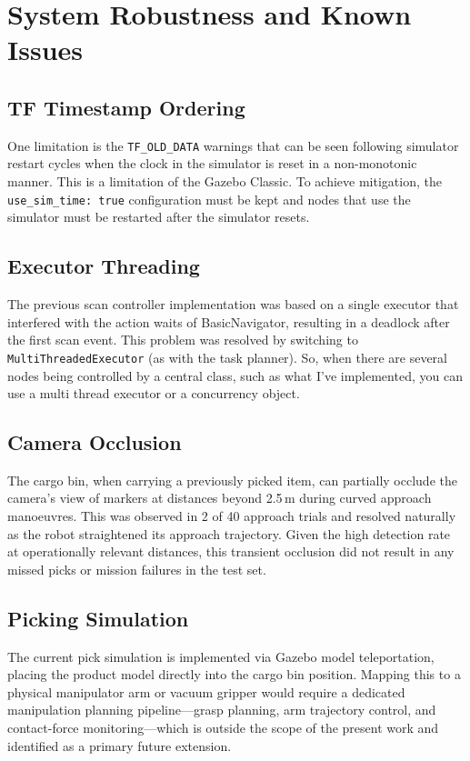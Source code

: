 \documentclass[12pt,a4paper]{report}
\begin{document}
\section{System Robustness and Known Issues}

\subsection{TF Timestamp Ordering}

One limitation is the \texttt{TF\_OLD\_DATA} warnings that can be seen following simulator restart cycles when the clock in the simulator is reset in a non-monotonic manner. This is a limitation of the Gazebo Classic. To achieve mitigation, the \texttt{use\_sim\_time: true} configuration must be kept and nodes that use the simulator must be restarted after the simulator resets.

\subsection{Executor Threading}

The previous scan controller implementation was based on a single executor that interfered with the action waits of BasicNavigator, resulting in a deadlock after the first scan event. This problem was resolved by switching to \texttt{MultiThreadedExecutor} (as with the task planner). So, when there are several nodes being controlled by a central class, such as what I've implemented, you can use a multi thread executor or a concurrency object.

\subsection{Camera Occlusion}

The cargo bin, when carrying a previously picked item, can partially occlude the camera's view of markers at distances beyond 2.5\,m during curved approach manoeuvres. This was observed in 2 of 40 approach trials and resolved naturally as the robot straightened its approach trajectory. Given the high detection rate at operationally relevant distances, this transient occlusion did not result in any missed picks or mission failures in the test set.

\subsection{Picking Simulation}

The current pick simulation is implemented via Gazebo model teleportation, placing the product model directly into the cargo bin position. Mapping this to a physical manipulator arm or vacuum gripper would require a dedicated manipulation planning pipeline—grasp planning, arm trajectory control, and contact-force monitoring—which is outside the scope of the present work and identified as a primary future extension.
\end{document}

